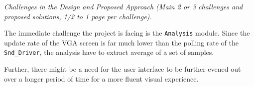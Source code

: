\emph{Challenges in the Design and Proposed Approach (Main 2 or 3 challenges and proposed solutions, 1/2 to 1 page per challenge).}


The immediate challenge the project is facing is the \verb+Analysis+ module. Since the update rate of the VGA screen is far much lower than the polling rate of the \verb+Snd_Driver+, the analysis have to extract average of a set of samples. 


Further, there might be a need for the user interface to be further evened out over a longer period of time for a more fluent visual experience.
